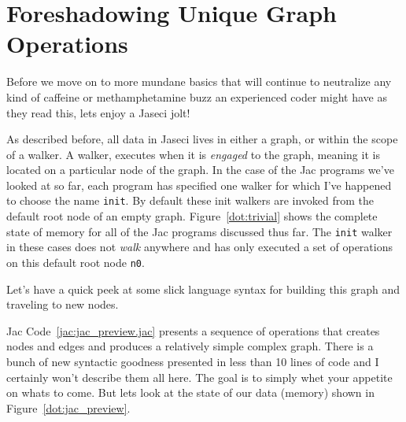 \section{Foreshadowing Unique Graph Operations}
Before we move on to more mundane basics that will continue to neutralize any kind of caffeine or methamphetamine buzz an experienced \gls{coder} might have as they read this, lets enjoy a \gls{Jaseci jolt}!
\par
As described before, all data in Jaseci lives in either a graph, or within the scope of a \gls{walker}. A walker, executes when it is \emph{engaged} to the graph, meaning it is located on a particular node of the graph. In the case of the Jac programs we've looked at so far, each program has specified one walker for which I've happened to choose the name \lstinline{init}. By default these init walkers are invoked from the default root node of an empty graph. Figure~\ref{dot:trivial} shows the complete state of memory for all of the Jac programs discussed thus far. The \lstinline{init} walker in these cases does not \emph{walk} anywhere and has only executed a set of operations on this default root node \texttt{n0}.
\par
Let's have a quick peek at some slick language syntax for building this graph and traveling to new nodes.
\par
{}
\par
{}
Jac Code~\ref{jac:jac_preview.jac} presents a sequence of operations that creates nodes and edges and produces a relatively simple complex graph. There is a bunch of new syntactic goodness presented in less than 10 lines of code and I certainly won't describe them all here. The goal is to simply whet your appetite on whats to come. But lets look at the state of our data (memory) shown in Figure~\ref{dot:jac_preview}.


